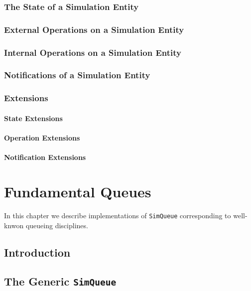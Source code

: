 \documentclass[12pt]{book}
\begin{document}
\subsection{The State of a Simulation Entity}

\subsection{External Operations on a Simulation Entity}

\subsection{Internal Operations on a Simulation Entity}

\subsection{Notifications of a Simulation Entity}

\subsection{Extensions}

\subsubsection{State Extensions}

\subsubsection{Operation Extensions}

\subsubsection{Notification Extensions}

\chapter{Fundamental Queues}
\label{chap:fundamental}

In this chapter we describe implementations of \lstinline|SimQueue| corresponding
  to well-knwon queueing disciplines.

\section{Introduction}

\section{The Generic \lstinline{SimQueue}}
\label{simqueue-generic}
\end{document}
